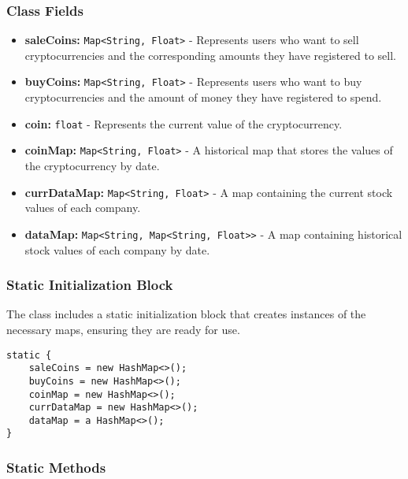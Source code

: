 \documentclass{article}
\begin{document}
\subsubsection{Class Fields}

\begin{itemize}
    \item \textbf{saleCoins:} \texttt{Map<String, Float>} - Represents users who want to sell cryptocurrencies and the corresponding amounts they have registered to sell.
    
    \item \textbf{buyCoins:} \texttt{Map<String, Float>} - Represents users who want to buy cryptocurrencies and the amount of money they have registered to spend.
    
    \item \textbf{coin:} \texttt{float} - Represents the current value of the cryptocurrency.
    
    \item \textbf{coinMap:} \texttt{Map<String, Float>} - A historical map that stores the values of the cryptocurrency by date.
    
    \item \textbf{currDataMap:} \texttt{Map<String, Float>} - A map containing the current stock values of each company.
    
    \item \textbf{dataMap:} \texttt{Map<String, Map<String, Float>>} - A map containing historical stock values of each company by date.
\end{itemize}

\subsubsection{Static Initialization Block}

The class includes a static initialization block that creates instances of the necessary maps, ensuring they are ready for use.

\begin{verbatim}
static {
    saleCoins = new HashMap<>();
    buyCoins = new HashMap<>();
    coinMap = new HashMap<>();
    currDataMap = new HashMap<>();
    dataMap = a HashMap<>();
}
\end{verbatim}

\subsubsection{Static Methods}
\end{document}
